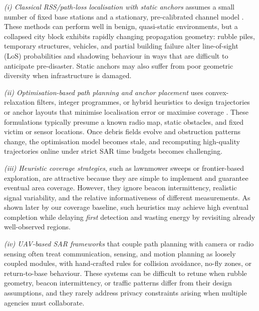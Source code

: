 \documentclass[drones,article,accept,pdftex,moreauthors]{Definitions/mdpi}
\begin{document}
\emph{(i) Classical RSS/path-loss localisation with static anchors}
assumes a small number of fixed base stations and a stationary, pre-calibrated channel model
\citep{zanellaBestPracticeRSS2016,liuRSSDistributionBasedPassive2016,tomicRSSBasedLocalizationWireless2015}.
These methods can perform well in benign, quasi-static environments, but a collapsed city block exhibits rapidly changing propagation geometry: rubble piles, temporary structures, vehicles, and partial building failure alter line-of-sight (LoS) probabilities and shadowing behaviour in ways that are difficult to anticipate pre-disaster. Static anchors may also suffer from poor geometric diversity when infrastructure is damaged.

\emph{(ii) Optimisation-based path planning and anchor placement}
uses convex-relaxation filters, integer programmes, or hybrid heuristics to design trajectories or anchor layouts that minimise localisation error or maximise coverage
\citep{tomicRSSBasedLocalizationWireless2015,zhangOptimalPlacementMethod2014,rubinaNovelHybridPath2017}.
These formulations typically presume a known radio map, static obstacles, and fixed victim or sensor locations. Once debris fields evolve and obstruction patterns change, the optimisation model becomes stale, and recomputing high-quality trajectories online under strict SAR time budgets becomes challenging.

\emph{(iii) Heuristic coverage strategies}, such as lawnmower sweeps or frontier-based exploration, are attractive because they are simple to implement and guarantee eventual area coverage. However, they ignore beacon intermittency, realistic signal variability, and the relative informativeness of different measurements. As shown later by our coverage baseline, such heuristics may achieve high eventual completion while delaying \emph{first} detection and wasting energy by revisiting already well-observed regions.

\emph{(iv) UAV-based SAR frameworks} that couple path planning with camera or radio sensing
\citep{tomicFullyAutonomousUAV2012,hanSurveyMobileAnchor2016,wangGuideLocUAVAssistedMultitarget2017}
often treat communication, sensing, and motion planning as loosely coupled modules, with hand-crafted rules for collision avoidance, no-fly zones, or return-to-base behaviour. These systems can be difficult to retune when rubble geometry, beacon intermittency, or traffic patterns differ from their design assumptions, and they rarely address privacy constraints arising when multiple agencies must collaborate.
\end{document}

